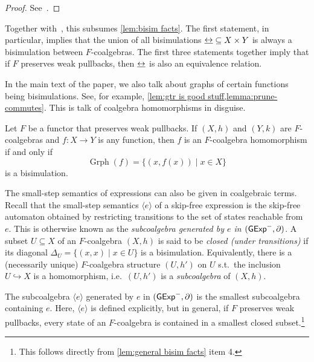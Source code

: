 \documentclass[orivec,envcountsect,envcountsame]{llncs}
\begin{document}
\begin{proof}
	See~\cite[Theorems 5.2, 5.4, 5.5 and 6.4]{coalgebra}.
\end{proof}

Together with~\cite[Theorem 5.4]{coalgebra}, this subsumes \cref{lem:bisim facts}.
The first statement, in particular, implies that the union of all bisimulations \({\bisim} \subseteq X \times Y\) is always a bisimulation between \(F\)-coalgebras.
The first three statements together imply that if \(F\) preserves weak pullbacks, then \(\bisim\) is also an equivalence relation.

In the main text of the paper, we also talk about graphs of certain functions being bisimulations.
See, for example, \cref{lem:gtr is good stuff,lemma:prune-commutes}.
This is talk of coalgebra homomorphisms in disguise.

\begin{lemma}\label{lem:same as homom}
	Let \(F\) be a functor that preserves weak pullbacks.
	If \((X, h)\) and \((Y, k)\) are \(F\)-coalgebras and \(f : X \to Y\) is any function, then \(f\) is an \(F\)-coalgebra homomorphism if and only if
	\[
	\operatorname{Grph}(f) = \{(x, f(x)) \mid x \in X\}
	\]
	is a bisimulation.
\end{lemma}

The small-step semantics of expressions can also be given in coalgebraic terms.
Recall that the small-step semantics \(\langle e\rangle\) of a skip-free \GKAT expression is the skip-free automaton obtained by restricting transitions to the set of states reachable from \(e\).
This is otherwise known as the \emph{subcoalgebra generated by \(e\) in \((\mathsf{GExp}^-, \partial)\)}.
A subset \(U \subseteq X\) of an \(F\)-coalgebra \((X, h)\) is said to be \emph{closed (under transitions)} if its diagonal \(\Delta_U = \{(x, x) \mid x \in U\}\) is a bisimulation.
Equivalently, there is a (necessarily unique) \(F\)-coalgebra structure \((U, h')\) on \(U\) s.t.\ the inclusion \(U \hookrightarrow X\) is a homomorphism, i.e.\ \((U, h')\) is a \emph{subcoalgebra} of \((X, h)\).

The subcoalgebra \(\langle e\rangle\) generated by \(e\) in \((\mathsf{GExp}^-, \partial)\) is the smallest subcoalgebra containing \(e\).
Here, \(\langle e\rangle\) is defined explicitly, but in general, if \(F\) preserves weak pullbacks, every state of an \(F\)-coalgebra is contained in a smallest closed subset.\footnote{This follows directly from \cref{lem:general bisim facts} item 4.}
\end{document}
